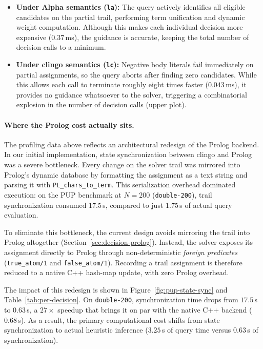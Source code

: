 \begin{itemize}[itemsep=2pt]
    \item \textbf{Under Alpha semantics (\texttt{la}):} The query actively identifies all eligible candidates on the partial trail, performing term unification and dynamic weight computation. Although this makes each individual decision more expensive ($0.37$\,ms), the guidance is accurate, keeping the total number of decision calls to a minimum.
    \item \textbf{Under clingo semantics (\texttt{lc}):} Negative body literals fail immediately on partial assignments, so the query aborts after finding zero candidates. While this allows each call to terminate roughly eight times faster ($0.043$\,ms), it provides no guidance whatsoever to the solver, triggering a combinatorial explosion in the number of decision calls (upper plot).
\end{itemize}

\paragraph{Where the Prolog cost actually sits.}
The profiling data above reflects an architectural redesign of the Prolog backend. In our initial implementation, state synchronization between clingo and Prolog was a severe bottleneck. Every change on the solver trail was mirrored into Prolog's dynamic database by formatting the assignment as a text string and parsing it with \texttt{PL\_chars\_to\_term}. This serialization overhead dominated execution: on the PUP benchmark at $N=200$ (\texttt{double-200}), trail synchronization consumed $17.5$\,s, compared to just $1.75$\,s of actual query evaluation.

To eliminate this bottleneck, the current design avoids mirroring the trail into Prolog altogether (Section~\ref{sec:decision-prolog}). Instead, the solver exposes its assignment directly to Prolog through non-deterministic \emph{foreign predicates} (\texttt{true\_atom/1} and \texttt{false\_atom/1}). Recording a trail assignment is therefore reduced to a native C++ hash-map update, with zero Prolog overhead.

The impact of this redesign is shown in Figure~\ref{fig:pup-state-sync} and Table~\ref{tab:per-decision}. On \texttt{double-200}, synchronization time drops from $17.5$\,s to $0.63$\,s, a $27\times$ speedup that brings it on par with the native C++ backend ($0.68$\,s). As a result, the primary computational cost shifts from state synchronization to actual heuristic inference ($3.25$\,s of query time versus $0.63$\,s of synchronization).

